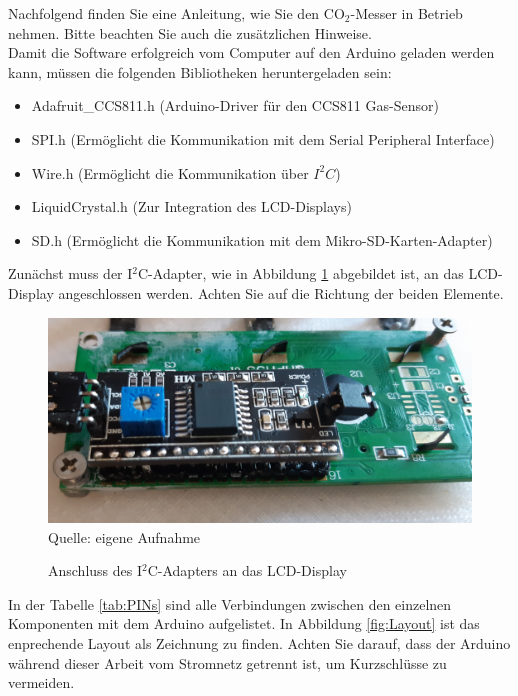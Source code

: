 \label{Installationsanleitung}

Nachfolgend finden Sie eine Anleitung, wie Sie den CO$_2$-Messer in Betrieb nehmen. Bitte beachten Sie auch die zusätzlichen Hinweise. \\
Damit die Software erfolgreich vom Computer auf den Arduino geladen werden kann, müssen die folgenden Bibliotheken heruntergeladen sein:

\begin{itemize}
	\item Adafruit\_CCS811.h (Arduino-Driver für den CCS811 Gas-Sensor)
	\item SPI.h (Ermöglicht die Kommunikation mit dem Serial Peripheral Interface)
	\item Wire.h (Ermöglicht die Kommunikation über $I^2C$)
	\item LiquidCrystal.h (Zur Integration des \ac{LCD}-Displays)
	\item SD.h (Ermöglicht die Kommunikation mit dem Mikro-SD-Karten-Adapter)
\end{itemize}


Zunächst muss der I$^2$C-Adapter, wie in Abbildung \ref{fig:I2C} abgebildet ist, an das \ac{LCD}-Display angeschlossen werden. Achten Sie auf die Richtung der beiden Elemente. 

\begin{figure}[!hbt]
	\centering
	\includegraphics[width=0.6\linewidth]{Images/I2C}
	\footnotesize \\Quelle: eigene Aufnahme
	\caption{Anschluss des I$^2$C-Adapters an das \ac{LCD}-Display}
	\label{fig:I2C}
\end{figure}

In der Tabelle \ref{tab:PINs} sind alle Verbindungen zwischen den einzelnen Komponenten mit dem Arduino aufgelistet. In Abbildung \ref{fig:Layout} ist das enprechende Layout als Zeichnung zu finden. Achten Sie darauf, dass der Arduino während dieser Arbeit vom Stromnetz getrennt ist, um Kurzschlüsse zu vermeiden.

